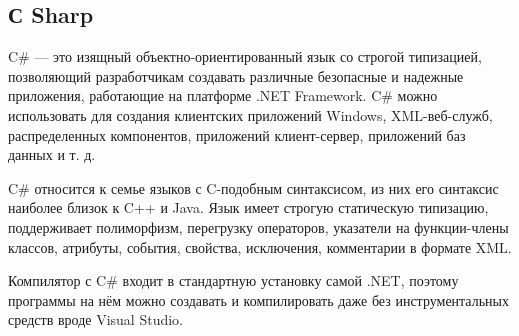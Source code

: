 \subsection{С Sharp}


C\# — это изящный объектно-ориентированный язык со строгой типизацией, позволяющий разработчикам создавать различные безопасные и надежные приложения, работающие на платформе .NET Framework. C\# можно использовать для создания клиентских приложений Windows, XML-веб-служб, распределенных компонентов, приложений клиент-сервер, приложений баз данных и т. д.


C\# относится к семье языков с C-подобным синтаксисом, из них его синтаксис наиболее близок к C++ и Java. Язык имеет строгую статическую типизацию, поддерживает полиморфизм, перегрузку операторов, указатели на функции-члены классов, атрибуты, события, свойства, исключения, комментарии в формате XML.

Компилятор с C\# входит в стандартную установку самой .NET, поэтому программы на нём можно создавать и компилировать даже без инструментальных средств вроде Visual Studio.